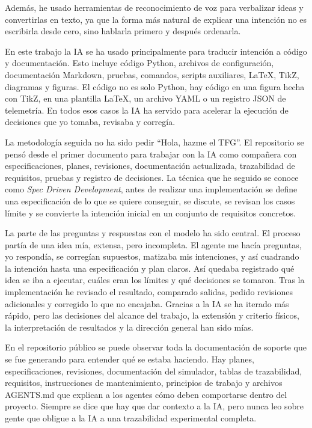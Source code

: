 Además, he usado herramientas de reconocimiento de voz para verbalizar ideas y
convertirlas en texto, ya que la forma más natural de explicar una intención no
es escribirla desde cero, sino hablarla primero y después ordenarla.

En este trabajo la IA se ha usado principalmente para traducir intención
a código y documentación. Esto incluye código Python, archivos de configuración,
documentación Markdown, pruebas, comandos, scripts auxiliares, LaTeX, TikZ,
diagramas y figuras. El código no es solo Python, hay código en una figura hecha
con TikZ, en una plantilla LaTeX, un archivo YAML o un registro JSON de telemetría.
En todos esos casos la IA ha servido para acelerar la ejecución de decisiones que yo
tomaba, revisaba y corregía.

La metodología seguida no ha sido pedir ``Hola, hazme el TFG''. El repositorio se pensó
desde el primer documento para trabajar con la IA como compañera con especificaciones, planes,
revisiones, documentación actualizada, trazabilidad de requisitos, pruebas y registro de decisiones.
La técnica que he seguido se conoce como \textit{Spec Driven Development}, antes de realizar
una implementación se define una especificación de lo que se quiere conseguir, se discute, se revisan
los casos límite y se convierte la intención inicial en un conjunto de requisitos concretos.

La parte de las preguntas y respuestas con el modelo ha sido central. El proceso partía de
una idea mía, extensa, pero incompleta. El agente me hacía preguntas, yo respondía, se corregían
supuestos, matizaba mis intenciones, y así cuadrando la intención hasta una especificación y plan
claros. Así quedaba registrado qué idea se iba a ejecutar, cuáles eran los límites y qué decisiones se
tomaron. Tras la implementación he revisado el resultado, comparado salidas, pedido revisiones adicionales
y corregido lo que no encajaba. Gracias a la IA se ha iterado más rápido, pero las decisiones del
alcance del trabajo, la extensión y criterio físicos, la interpretación de resultados y la dirección
general han sido mías.

En el repositorio público se puede observar toda la documentación de soporte que se fue generando para
entender qué se estaba haciendo. Hay planes, especificaciones, revisiones, documentación del simulador,
tablas de trazabilidad, requisitos, instrucciones de mantenimiento, principios de trabajo y
archivos AGENTS.md que explican a los agentes cómo deben comportarse dentro del proyecto.
Siempre se dice que hay que dar contexto a la IA, pero nunca leo sobre gente que obligue a la IA
a una trazabilidad experimental completa.

